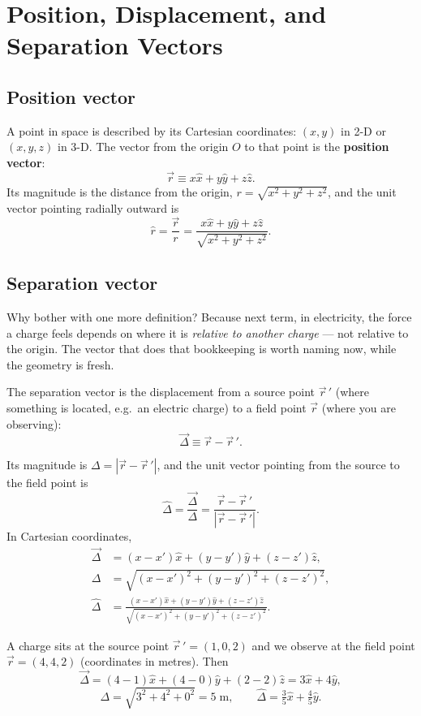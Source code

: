 \section{Position, Displacement, and Separation Vectors}

\subsection{Position vector}
A point in space is described by its Cartesian coordinates: $(x,y)$ in 2-D or $(x,y,z)$ in
3-D. The vector from the origin $O$ to that point is the \textbf{position vector}:
\[
  \vec{r} \equiv x\hat{x}+y\hat{y}+z\hat{z}.
\]
Its magnitude is the distance from the origin, $r=\sqrt{x^2+y^2+z^2}$, and the unit vector
pointing radially outward is
\[
  \hat{r} = \frac{\vec{r}}{r} = \frac{x\hat{x}+y\hat{y}+z\hat{z}}{\sqrt{x^2+y^2+z^2}}.
\]

\subsection{Separation vector}

Why bother with one more definition? Because next term, in electricity, the
force a charge feels depends on where it is \emph{relative to another charge} ---
not relative to the origin. The vector that does that bookkeeping is worth
naming now, while the geometry is fresh.

\begin{keybox}
The separation vector is the displacement from a source point $\vec{r}\,'$ (where something
is located, e.g.\ an electric charge) to a field point $\vec{r}$ (where you are observing):
\[
  \vec{\Delta} \equiv \vec{r}-\vec{r}\,'.
\]
\end{keybox}

Its magnitude is $\Delta=|\vec{r}-\vec{r}\,'|$, and the unit vector pointing from the source to the
field point is
\[
  \hat{\Delta} = \frac{\vec{\Delta}}{\Delta} = \frac{\vec{r}-\vec{r}\,'}{|\vec{r}-\vec{r}\,'|}.
\]
In Cartesian coordinates,
\begin{align*}
  \vec{\Delta} &= (x-x')\hat{x}+(y-y')\hat{y}+(z-z')\hat{z},\\
  \Delta &= \sqrt{(x-x')^2+(y-y')^2+(z-z')^2},\\
  \hat{\Delta} &= \frac{(x-x')\hat{x}+(y-y')\hat{y}+(z-z')\hat{z}}{\sqrt{(x-x')^2+(y-y')^2+(z-z')^2}}.
\end{align*}

\begin{workedexample}
A charge sits at the source point $\vec{r}\,'=(1,0,2)$ and we observe at the field point
$\vec{r}=(4,4,2)$ (coordinates in metres). Then
\[
  \vec{\Delta} = (4-1)\hat{x}+(4-0)\hat{y}+(2-2)\hat{z} = 3\hat{x}+4\hat{y},
\]
\[
  \Delta = \sqrt{3^2+4^2+0^2} = 5\;\text{m}, \qquad
  \hat{\Delta} = \tfrac{3}{5}\hat{x}+\tfrac{4}{5}\hat{y}.
\]
\end{workedexample}

